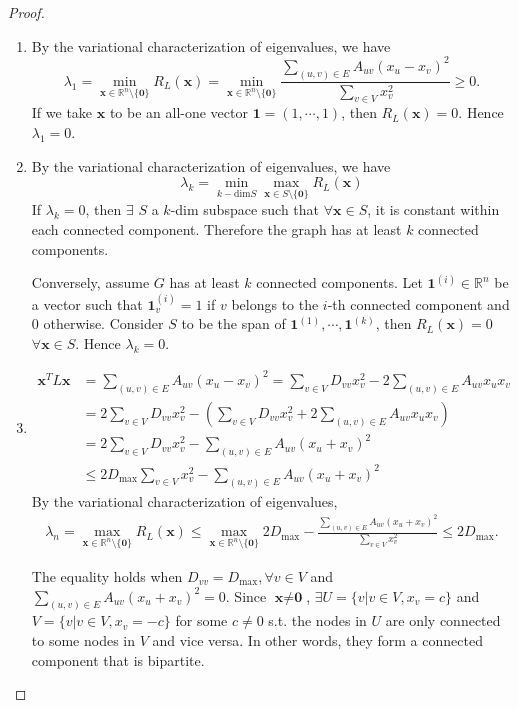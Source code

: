 \documentclass[a4paper]{article}
\theoremstyle{definition}
\begin{document}
\begin{proof}
\hfill
\begin{enumerate}
    \item By the variational characterization of eigenvalues, we have
    \begin{equation}\lambda_1=\min_{\textbf{x}\in\mathbb{R}^{n}\setminus\{\textbf{0}\}}R_L(\textbf{x})=\min_{\textbf{x}\in\mathbb{R}^{n}\setminus\{\textbf{0}\}}\frac{\sum_{(u, v)\in E}A_{uv}(x_u-x_v)^2}{\sum_{v\in V}x_v^2}\geq 0.\end{equation} If we take $\textbf{x}$ to be an all-one vector $\textbf{1}=(1,\cdots, 1)$, then $R_L(\textbf{x})=0$. Hence $\lambda_1=0$.

    \item By the variational characterization of eigenvalues, we have
    \begin{equation}\lambda_k=\min_{k-\text{dim}S}\max_{\textbf{x}\in S\setminus\{\textbf{0}\}}R_{L}(\textbf{x})\end{equation} If $\lambda_k=0$, then $\exists$ $S$ a $k$-dim subspace such that $\forall \textbf{x}\in S$, it is constant within each connected component. Therefore the graph has at least $k$ connected components.
    
    Conversely, assume $G$ has at least $k$ connected components. Let $\textbf{1}^{(i)}\in\mathbb{R}^{n}$ be a vector such that $\textbf{1}^{(i)}_v=1$ if $v$ belongs to the $i$-th connected component and $0$ otherwise. Consider $S$ to be the span of $\textbf{1}^{(1)}, \cdots, \textbf{1}^{(k)}$, then $R_{L}(\textbf{x})=0$ $\forall \textbf{x}\in S$. Hence $\lambda_k=0$.

    \item \begin{align}\textbf{x}^{T}L\textbf{x}&=\sum_{(u, v)\in E}A_{uv}(x_u-x_v)^2=\sum_{v\in V}D_{vv}x_v^2 - 2\sum_{(u, v)\in E}A_{uv}x_u x_v\\
    &= 2\sum_{v\in V}D_{vv}x_v^2 - (\sum_{v\in V}D_{vv}x_v^2 + 2\sum_{(u, v)\in E}A_{uv}x_u x_v)\\
    &= 2\sum_{v\in V}D_{vv}x_v^2 - \sum_{(u, v)\in E}A_{uv}(x_u+x_v)^2\\
    &\leq 2D_{\max}\sum_{v\in V}x_v^2 - \sum_{(u, v)\in E}A_{uv}(x_u+x_v)^2 \end{align}
    By the variational characterization of eigenvalues, \ \begin{align}\lambda_n=\max_{\textbf{x}\in\mathbb{R}^{n}\setminus\{\textbf{0}\}}R_{L}(\textbf{x}) \leq \max_{\textbf{x}\in\mathbb{R}^{n}\setminus\{\textbf{0}\}} 2D_{\max} - \frac{\sum_{(u, v)\in E}A_{uv}(x_u+x_v)^2}{\sum_{v\in V}x_v^2}\leq 2D_{\max}. \end{align}
    
    The equality holds when $D_{vv}=D_{\max}, \forall v\in V$ and $\sum_{(u, v)\in E}A_{uv}(x_u+x_v)^2=0$. Since $\textbf{x}\neq \textbf{0}$, $\exists U=\{v | v\in V, x_v=c\}$ and $V=\{v | v\in V, x_v=-c\}$ for some $c\neq 0$ s.t. the nodes in $U$ are only connected to some nodes in $V$ and vice versa. In other words, they form a connected component that is bipartite.
\end{enumerate}
\end{proof}
\end{document}
